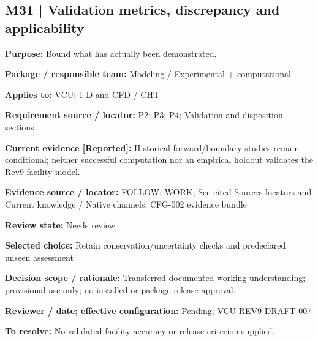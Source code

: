 \documentclass[11pt]{article}
\begin{document}
\par\noindent\begin{minipage}{\textwidth}\small\setlength{\parskip}{2pt}
\subsection*{M31 | Validation metrics, discrepancy and applicability}
\textbf{Purpose:} Bound what has actually been demonstrated.\par
\textbf{Package / responsible team:} Modeling / Experimental + computational\par
\textbf{Applies to:} VCU; 1-D and CFD / CHT\par
\textbf{Requirement source / locator:} P2; P3; P4; Validation and disposition sections\par
\textbf{Current evidence [Reported]:} Historical forward/boundary studies remain conditional; neither successful computation nor an empirical holdout validates the Rev9 facility model.\par
\textbf{Evidence source / locator:} FOLLOW; WORK; See cited Sources locators and Current knowledge / Native channels; CFG-002 evidence bundle\par
\textbf{Review state:} Needs review\par
\textbf{Selected choice:} Retain conservation/uncertainty checks and predeclared unseen assessment\par
\textbf{Decision scope / rationale:} Transferred documented working understanding; provisional use only; no installed or package release approval.\par
\textbf{Reviewer / date; effective configuration:} Pending; VCU-REV9-DRAFT-007\par
\textbf{To resolve:} No validated facility accuracy or release criterion supplied.\par
\end{minipage}\par\vspace{5pt}
\end{document}
